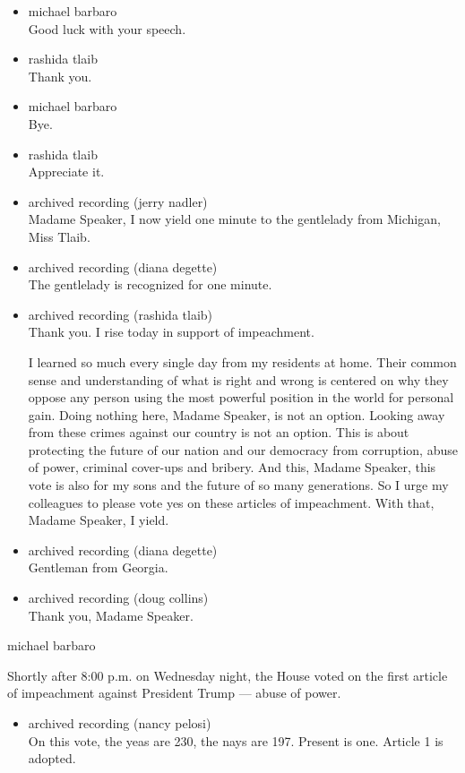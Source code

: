 \begin{itemize}
\item
  michael barbaro\\
  Good luck with your speech.
\item
  rashida tlaib\\
  Thank you.
\item
  michael barbaro\\
  Bye.
\item
  rashida tlaib\\
  Appreciate it.
\item
  archived recording (jerry nadler)\\
  Madame Speaker, I now yield one minute to the gentlelady from
  Michigan, Miss Tlaib.
\item
  archived recording (diana degette)\\
  The gentlelady is recognized for one minute.
\item
  archived recording (rashida tlaib)\\
  Thank you. I rise today in support of impeachment.

  I learned so much every single day from my residents at home. Their
  common sense and understanding of what is right and wrong is centered
  on why they oppose any person using the most powerful position in the
  world for personal gain. Doing nothing here, Madame Speaker, is not an
  option. Looking away from these crimes against our country is not an
  option. This is about protecting the future of our nation and our
  democracy from corruption, abuse of power, criminal cover-ups and
  bribery. And this, Madame Speaker, this vote is also for my sons and
  the future of so many generations. So I urge my colleagues to please
  vote yes on these articles of impeachment. With that, Madame Speaker,
  I yield.
\item
  archived recording (diana degette)\\
  Gentleman from Georgia.
\item
  archived recording (doug collins)\\
  Thank you, Madame Speaker.
\end{itemize}

michael barbaro

Shortly after 8:00 p.m. on Wednesday night, the House voted on the first
article of impeachment against President Trump --- abuse of power.

\begin{itemize}
\tightlist
\item
  archived recording (nancy pelosi)\\
  On this vote, the yeas are 230, the nays are 197. Present is one.
  Article 1 is adopted.
\end{itemize}

